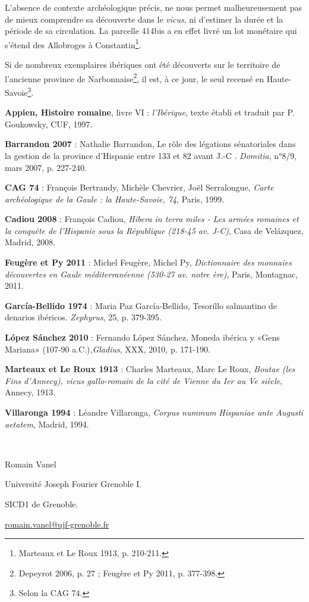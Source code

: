 \documentclass[a4paper,12pt]{article}
\begin{document}
L’absence de contexte archéologique précis, ne nous permet malheureusement
pas de mieux comprendre sa découverte dans le \emph{vicus}, ni d’estimer la durée
et la période de sa circulation. La parcelle 414bis a en effet livré un lot
monétaire qui s’étend des Allobroges à Constantin\footnote{Marteaux et Le Roux 1913, p. 210-211.}.

Si de nombreux exemplaires ibériques ont été découverts sur le territoire
de l’ancienne province de Narbonnaise\footnote{Depeyrot 2006, p. 27 ; Feugère et Py 2011, p. 377-398.}, il est, à ce jour, le seul recensé en
Haute-Savoie\footnote{Selon la CAG 74.}.



\begin{thebibliography}{9}

\textbf{Appien, Histoire romaine}, livre VI : \textit{l’Ibérique}, texte établi et traduit par
P. Goukowsky, CUF, 1997.

\textbf{Barrandon 2007} : Nathalie Barrandon, Le rôle des légations sénatoriales
dans la gestion de la province d’Hispanie entre 133 et 82 avant J.-C . \emph{Domitia},
n°8/9, mars 2007, p. 227-240.

\textbf{CAG 74} : François Bertrandy, Michèle Chevrier, Joël Serralongue, \emph{Carte
archéologique de la Gaule : la Haute-Savoie, 74}, Paris, 1999.

\textbf{Cadiou 2008} : François Cadiou,\emph{ Hibera in terra miles - Les armées romaines
et la conquête de l’Hispanie sous la République (218-45 av. J-C)}, Casa de
Velázquez, Madrid, 2008.

\textbf{Feugère et Py 2011} : Michel Feugère, Michel Py, \emph{Dictionnaire des monnaies
découvertes en Gaule méditerranéenne (530-27 av. notre ère)}, Paris,
Montagnac, 2011.

\textbf{García-Bellido 1974} : Maria Paz García-Bellido, Tesorillo salmantino de
denarios ibéricos. \emph{Zephyrus}, 25, p. 379-395.

\textbf{López Sánchez 2010} : Fernando López Sánchez, Moneda ibérica y «Gens
Mariana» (107-90 a.C.),\emph{Gladius}, XXX, 2010, p. 171-190.

\textbf{Marteaux et Le Roux 1913} : Charles Marteaux, Marc Le Roux, \emph{\emph{Boutae} (les
Fins d’Annecy), vicus gallo-romain de la cité de Vienne du Ier au Ve siècle},
Annecy, 1913.

\textbf{Villaronga 1994	} : Léandre Villaronga, \emph{Corpus nummum Hispaniae ante
Augusti aetatem}, Madrid, 1994.

\end{thebibliography}

~

Romain Vanel

Université Joseph Fourier Grenoble I.

SICD1 de Grenoble.

\url{romain.vanel@ujf-grenoble.fr}
\end{document}

